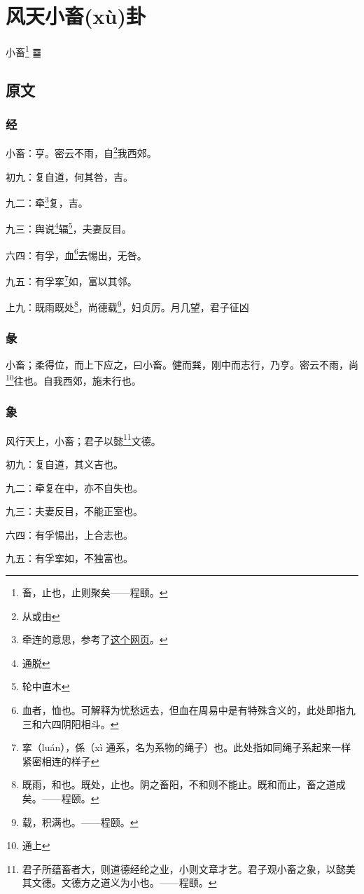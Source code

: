 \documentclass[12pt,oneside]{book}
\begin{document}
\chapter{风天小畜(xù)卦}
小畜\footnote{畜，止也，止则聚矣——程颐。} {\Large ䷈}

\section{原文}

\subsection{经}
小畜：亨。密云不雨，自\footnote{从或由}我西郊。

初九：复自道，何其咎，吉。

九二：牵\footnote{牵连的意思，参考了\href{http://baike.yidao5.com/jingzhuan/xiaoxugua/6428.shtml}{这个网页}。}复，吉。

九三：舆说\footnote{通脱}辐\footnote{轮中直木}，夫妻反目。

六四：有孚，血\footnote{血者，恤也。可解释为忧愁远去，但血在周易中是有特殊含义的，此处即指九三和六四阴阳相斗。}去惕出，无咎。

九五：有孚挛\footnote{挛（luán），係（xì 通系，名为系物的绳子）也。此处指如同绳子系起来一样紧密相连的样子}如，富以其邻。

上九：既雨既处\footnote{既雨，和也。既处，止也。阴之畜阳，不和则不能止。既和而止，畜之道成矣。——程颐。}，尚德载\footnote{载，积满也。——程颐。}，妇贞厉。月几望，君子征凶

\subsection{彖}
小畜；柔得位，而上下应之，曰小畜。健而巽，刚中而志行，乃亨。密云不雨，尚\footnote{通上}往也。自我西郊，施未行也。

\subsection{象}
风行天上，小畜；君子以懿\footnote{君子所蕴畜者大，则道德经纶之业，小则文章才艺。君子观小畜之象，以懿美其文德。文德方之道义为小也。——程颐。}文德。

初九：复自道，其义吉也。

九二：牵复在中，亦不自失也。

九三：夫妻反目，不能正室也。

六四：有孚惕出，上合志也。

九五：有孚挛如，不独富也。
\end{document}

